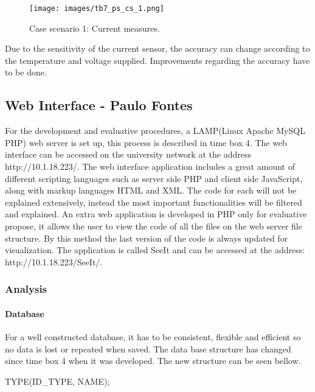 \begin{figure}[H]
	\begin{centering}
		\texttt{[image: images/tb7\_ps\_cs\_1.png]}
		\caption{Case scenario 1: Current measures.}
	\end{centering}
\end{figure}

Due to the sensitivity of the current sensor, the accuracy can change according to the temperature and voltage supplied. Improvements regarding the accuracy have to be done.

\subsection{Web Interface - Paulo Fontes}
For the development and evaluative procedures, a LAMP(Linux Apache MySQL PHP) web server is set up, this process is described in time box 4. The web interface can be accessed on the university network at the address http://10.1.18.223/.
\p
The web interface application includes a great amount of different scripting languages such as server side PHP and client side JavaScript, along with markup languages HTML and XML. The code for each will not be explained extensively, instead the most important functionalities will be filtered and explained.
\p
An extra web application is developed in PHP only for evaluative propose, it allows the user to view the code of all the files on the web server file structure. By this method the last version of the code is always updated for visualization. The application is called SeeIt and can be accessed at the address: http://10.1.18.223/SeeIt/. 

%
\subsubsection{Analysis}

\paragraph{Database}
For a well constructed database, it has to be consistent, flexible and efficient so no data is lost or repeated when saved. The data base structure has changed since time box 4 when it was developed. The new structure can be seen bellow.

TYPE(ID\_TYPE, NAME);

